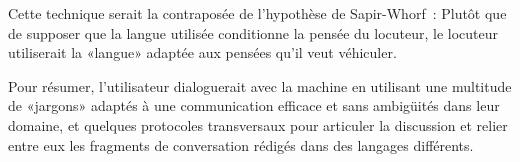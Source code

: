 \documentclass[french,a4paper]{article}
\begin{document}
Cette technique serait la contraposée de l'hypothèse de Sapir-Whorf~:
Plutôt que de supposer que la langue utilisée conditionne la pensée du
locuteur, le locuteur utiliserait la «langue» adaptée aux pensées
qu'il veut véhiculer.

Pour résumer, l'utilisateur dialoguerait avec la machine en utilisant
une multitude de «jargons» adaptés à une communication efficace et
sans ambigüités dans leur domaine, et quelques protocoles transversaux
pour articuler la discussion et relier entre eux les fragments de
conversation rédigés dans des langages différents.
\end{document}
